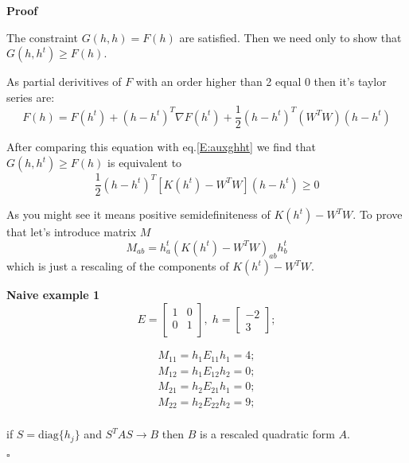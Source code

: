 \documentclass[oneside, final, 14pt]{extarticle}
\begin{document}
\textbf{Proof}

The constraint $G(h,h) = F(h)$ are satisfied. Then we need only
to show that $G(h,h^t) \geqslant F(h)$.

As partial derivitives of $F$ with an order higher than 2 equal
0 then it's taylor series are:
\begin{equation}\label{E:f_taylor}
  F(h) = F(h^t) + (h - h^t)^T \nabla F(h^t)
    + \frac{1}{2} (h - h^t)^T (W^TW) (h - h^t)
\end{equation}

After comparing this equation with eq.\eqref{E:auxghht} we find that
$G(h,h^t) \geqslant F(h)$ is equivalent to
\[
  \frac{1}{2} (h - h^t)^T \left[K(h^t) - W^TW\right] (h - h^t) \geqslant 0
\]

As you might see it means positive semidefiniteness of $K(h^t) - W^TW$.
To prove that let's introduce matrix $M$
\begin{equation}
  M_{ab} = h_a^t (K(h^t) - W^T W)_{ab} h_b^t
\end{equation}
which is just a rescaling of the components of $K(h^t) - W^TW$.

\textbf{Naive example 1}
\[
  E =
  \begin{bmatrix}
    1 & 0 \\
    0 & 1 \\
  \end{bmatrix}, \;
  h = \begin{bmatrix} -2 \\ 3 \end{bmatrix};
\]

\begin{align*}
  M_{11} = h_1 E_{11} h_1 = 4; \\
  M_{12} = h_1 E_{12} h_2 = 0; \\
  M_{21} = h_2 E_{21} h_1 = 0; \\
  M_{22} = h_2 E_{22} h_2 = 9; \\
\end{align*}

if $ S = \text{diag}\{h_j\}$ and $S^T A S \rightarrow B$
then $B$ is a rescaled quadratic form $A$.

$\square$
\end{document}
